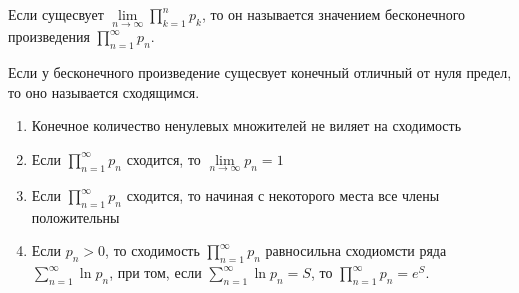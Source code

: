 \begin{definition} \thmslashn 

    Если сущесвует $\lim\limits_{n \to \infty} \prod\limits_{k=1}^{n} p_{k}$, то он называется значением бесконечного произведения $\prod\limits_{n=1}^{\infty}  p_{n}$.

    Если у бесконечного произведение сущесвует конечный отличный от нуля предел, то оно называется сходящимся.
\end{definition}
\begin{properties} \thmslashn

    \begin{enumerate}
        \item Конечное количество ненулевых множителей не виляет на сходимость
        \item Если $\prod\limits_{n=1}^{\infty}  p_{n}$ сходится, то $\lim\limits_{n \to \infty} p_{n} = 1$
        \item Если $\prod\limits_{n=1}^{\infty}  p_{n}$ сходится, то начиная с некоторого места все члены положительны
        \item Если $p_{n} > 0$, то сходимость $\prod\limits_{n=1}^{\infty} p_{n}$ равносильна сходиомсти ряда $\sum\limits_{n=1}^{\infty} \ln p_{n}$, при том, если $\sum\limits_{n=1}^{\infty} \ln p_{n} = S$, то $\prod\limits_{n=1}^{\infty} p_{n} = e^{S}$.
    \end{enumerate}
\end{properties}

